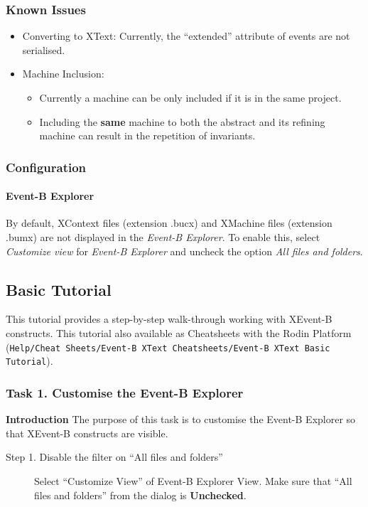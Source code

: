 \subsubsection{Known Issues}
\label{sec:known-issues}

\begin{itemize}
\item Converting to XText: Currently, the ``extended'' attribute of events are not serialised.

\item Machine Inclusion: 
\begin{itemize}
	\item Currently a machine can be only included if it is in the same project.
	\item Including the \textbf{same} machine to both the abstract and its refining machine can result in the repetition of invariants.
\end{itemize}

\end{itemize}

\subsubsection{Configuration}
\label{sec:configuration}

\paragraph{Event-B Explorer}
By default, XContext files (extension .bucx) and XMachine files (extension .bumx) are not displayed in the \emph{Event-B Explorer}. To enable this, select \emph{Customize view} for \emph{Event-B Explorer} and uncheck the option \emph{All files and folders}.

\subsection{Basic Tutorial}
\label{sec:basic-tutorial}

This tutorial provides a step-by-step walk-through working with XEvent-B constructs. This tutorial also available as Cheatsheets with the Rodin Platform (\texttt{Help/Cheat Sheets/Event-B XText Cheatsheets/Event-B XText Basic Tutorial}).

\subsubsection{Task 1. Customise the Event-B Explorer}
\textbf{Introduction}
The purpose of this task is to customise the Event-B Explorer so that XEvent-B constructs are visible.
\begin{description}
\item[Step 1. Disable the filter on ``All files and folders''] Select ``Customize View'' of Event-B Explorer View. Make sure that ``All files and folders'' from the dialog is \textbf{Unchecked}.
\end{description}

